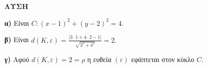 {\large \textbf{ΛΥΣΗ}}

\medskip

\textbf{α)} Είναι $C: (x-1)^2 + (y-2)^2 = 4.$

\medskip

\textbf{β)} Είναι $d(K, \varepsilon) = \frac{|3\cdot 1 + 4\cdot 2 - 1|}{\sqrt{3^2 + 4^2}} = 2.$

\medskip

\textbf{γ)} Αφού $d(K, \varepsilon) = 2 = \rho$ η ευθεία $(\varepsilon)$ εφάπτεται στον κύκλο $C.$
\endlysh